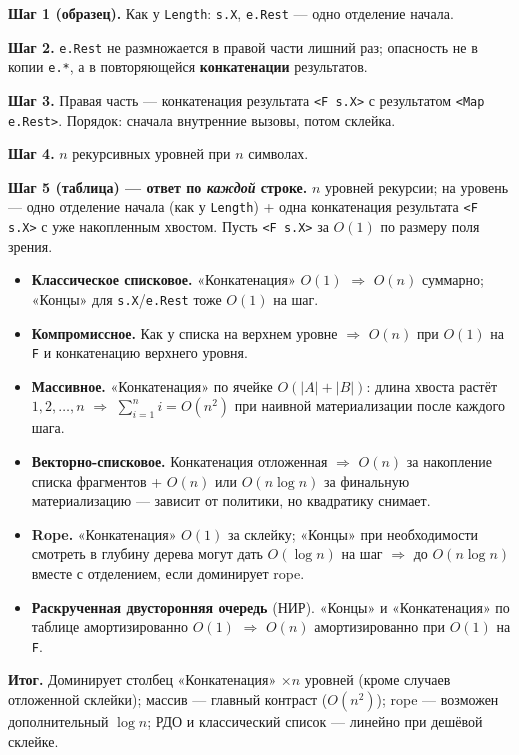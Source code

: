 \documentclass[12pt,a4paper]{article}
\newcommand{\bigO}{\ensuremath{O}}
\begin{document}
\textbf{Шаг 1 (образец).} Как у \texttt{Length}: \texttt{s.X}, \texttt{e.Rest} --- одно отделение начала.

\textbf{Шаг 2.} \texttt{e.Rest} не размножается в правой части лишний раз; опасность не в копии \texttt{e.*}, а в повторяющейся \textbf{конкатенации} результатов.

\textbf{Шаг 3.} Правая часть --- конкатенация результата \texttt{<F s.X>} с результатом \texttt{<Map e.Rest>}. Порядок: сначала внутренние вызовы, потом склейка.

\textbf{Шаг 4.} \(n\) рекурсивных уровней при \(n\) символах.

\textbf{Шаг 5 (таблица) --- ответ по \emph{каждой} строке.} \(n\) уровней рекурсии; на уровень --- одно отделение начала (как у \texttt{Length}) + одна конкатенация результата \texttt{<F s.X>} с уже накопленным хвостом. Пусть \texttt{<F s.X>} за \(O(1)\) по размеру поля зрения.

\begin{itemize}
  \item \textbf{Классическое списковое.} «Конкатенация» \(O(1)\) \(\Rightarrow\) \(\bigO(n)\) суммарно; «Концы» для \texttt{s.X}/\texttt{e.Rest} тоже \(O(1)\) на шаг.
  \item \textbf{Компромиссное.} Как у списка на верхнем уровне \(\Rightarrow\) \(\bigO(n)\) при \(O(1)\) на \texttt{F} и конкатенацию верхнего уровня.
  \item \textbf{Массивное.} «Конкатенация» по ячейке \(O(|A|+|B|)\): длина хвоста растёт \(1,2,\ldots,n\) \(\Rightarrow\) \(\sum_{i=1}^n i=\bigO(n^2)\) при наивной материализации после каждого шага.
  \item \textbf{Векторно-списковое.} Конкатенация отложенная \(\Rightarrow\) \(\bigO(n)\) за накопление списка фрагментов + \(\bigO(n)\) или \(\bigO(n\log n)\) за финальную материализацию --- зависит от политики, но квадратику снимает.
  \item \textbf{Rope.} «Конкатенация» \(O(1)\) за склейку; «Концы» при необходимости смотреть в глубину дерева могут дать \(\bigO(\log n)\) на шаг \(\Rightarrow\) до \(\bigO(n\log n)\) вместе с отделением, если доминирует rope.
  \item \textbf{Раскрученная двусторонняя очередь} (НИР). «Концы» и «Конкатенация» по таблице амортизированно \(O(1)\) \(\Rightarrow\) \(\bigO(n)\) амортизированно при \(O(1)\) на \texttt{F}.
\end{itemize}

\textbf{Итог.} Доминирует столбец «Конкатенация» \(\times n\) уровней (кроме случаев отложенной склейки); массив --- главный контраст (\(\bigO(n^2)\)); rope --- возможен дополнительный \(\log n\); РДО и классический список --- линейно при дешёвой склейке.
\end{document}
